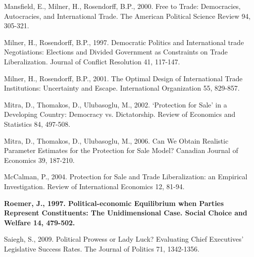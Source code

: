 \documentclass[10pt]{article}
\begin{document}
\begin{list}{}{\setlength{\leftmargin}{0.0in}\setlength{\rightmargin}{0.0in}\setlength{\itemindent}{0.0in}\setlength{\itemsep}{0.1in}}
\item Mansfield, E., Milner, H., Rosendorff, B.P., 2000. Free to Trade: Democracies, Autocracies, and International Trade. The American Political Science Review 94, 305-321.


\item Milner, H., Rosendorff, B.P., 1997. Democratic Politics and International trade Negotiations: Elections and Divided Government as Constraints on Trade Liberalization. Journal of Conflict Resolution 41, 117-147.

\item Milner, H., Rosendorff, B.P., 2001. The Optimal Design of International Trade Institutions: Uncertainty and Escape. International Organization 55, 829-857.

\item Mitra, D., Thomakos, D., Ulubasoglu, M., 2002. `Protection for Sale' in a Developing Country: Democracy vs. Dictatorship. Review of Economics and Statistics 84, 497-508.

\item Mitra, D., Thomakos, D., Ulubasoglu, M., 2006. Can We Obtain Realistic Parameter Estimates for the Protection for Sale Model? Canadian Journal of Economics 39, 187-210.


\item McCalman, P., 2004. Protection for Sale and Trade Liberalization: an Empirical Investigation. Review of International Economics 12, 81-94.


\item \textbf{Roemer, J., 1997. Political-economic Equilibrium when Parties Represent Constituents: The Unidimensional Case. Social Choice and Welfare 14, 479-502.}

\item Saiegh, S., 2009. Political  Prowess or Lady Luck? Evaluating Chief Executives' Legislative Success Rates. The Journal of Politics 71, 1342-1356.


\end{list}
\end{document}
